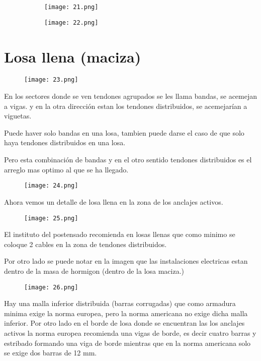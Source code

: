 \begin{figure}[H]
	\begin{subfigure}{0.5\textwidth}
	\centering
	\texttt{[image: 21.png]}
	\end{subfigure}
	\begin{subfigure}{0.5\textwidth}
	\centering
	\texttt{[image: 22.png]}
	\end{subfigure}
\end{figure}

\section{Losa llena (maciza)}

\begin{figure}[H]
\centering
\texttt{[image: 23.png]}
\end{figure}

En los sectores donde se ven tendones agrupados
se les llama bandas, se acemejan a vigas. y en la otra dirección
estan los tendones distribuidos, se acemejarían a viguetas.

Puede haver solo bandas en una losa, tambien puede darse el
caso de que solo haya tendones distribuidos en una losa.

Pero esta combinación de bandas y en el otro sentido tendones
distribuidos es el arreglo mas optimo al que se ha llegado.

\begin{figure}[H]
\centering
\texttt{[image: 24.png]}
\end{figure}

Ahora vemos un detalle de losa llena en la zona de los anclajes
activos.

\begin{figure}
\centering
\texttt{[image: 25.png]}
\end{figure}

El instituto del postensado recomienda en losas llenas que como
minimo se coloque 2 cables en la zona de tendones distribuidos.

Por otro lado se puede notar en la imagen que las instalaciones
electricas estan dentro de la masa de hormigon (dentro de la
losa maciza.)

\begin{figure}[H]
\centering
\texttt{[image: 26.png]}
\end{figure}

Hay una malla inferior distribuida (barras corrugadas) que como
armadura minima exige la norma europea, pero la norma americana
no exige dicha malla inferior. Por otro lado en el borde de losa
donde se encuentran las los anclajes activos la norma europea
recomienda una vigas de borde, es decir cuatro barras y estribado
formando una viga de borde mientras que en la norma americana
solo se exige dos barras de 12 mm.

